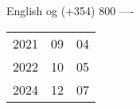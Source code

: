 \documentclass[10pt,a4paper]{article}
\begin{document}
	English og (+354) 800 ----

	\begin{tabular}{lll}
		2021 & 09 & 04\\
		2022 & 10 & 05\\
		2024 & 12 & 07
	\end{tabular}

	\vspace{1cm}

	
	
	
\end{document}
